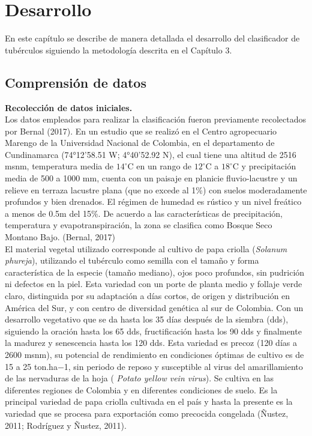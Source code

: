 \chapter{Desarrollo}

En este capítulo se describe de manera detallada el desarrollo del clasificador de tubérculos siguiendo la metodología descrita en el Capítulo 3.
\noindent
\section{Comprensión de datos}

\noindent
\textbf{Recolección de datos iniciales.}\\

Los datos empleados para realizar la clasificación fueron previamente recolectados por Bernal (2017). En un estudio que se realizó en el Centro agropecuario Marengo de la Universidad Nacional de Colombia, en el departamento de Cundinamarca (74°12'58.51 W; 4°40'52.92 N), el cual tiene una altitud de 2516 msnm, temperatura media de $14^\circ$C  en un rango de $12^\circ$C  a $18^\circ$C  y precipitación media de 500 a 1000 mm, cuenta con un paisaje en planicie fluvio-lacustre y un relieve en terraza lacustre plana (que no excede al 1\%) con suelos moderadamente profundos y bien drenados. El régimen de humedad es rústico y un nivel freático a menos de 0.5m del 15\%. De acuerdo a las características de precipitación, temperatura y evapotranspiración, la zona se clasifica como Bosque Seco Montano Bajo. (Bernal, 2017)\\

El material vegetal utilizado corresponde al cultivo de papa criolla (\textit{Solanum phureja}), utilizando el tubérculo como semilla con el tamaño y forma característica de la especie (tamaño mediano), ojos poco profundos, sin pudrición ni defectos en la piel. Esta variedad con un porte de planta medio y follaje verde claro, distinguida por su adaptación a días cortos, de origen y distribución en América del Sur, y con centro de diversidad genética al sur de Colombia. Con un desarrollo vegetativo que se da hasta los 35 días después de la siembra (dds), siguiendo la oración hasta los 65 dds, fructificación hasta los 90 dds y finalmente la madurez y senescencia hasta los 120 dds. Esta variedad es precoz (120 días a 2600 msnm), su potencial de rendimiento en condiciones óptimas de cultivo es de 15 a 25 ton.ha−1, sin periodo de reposo y susceptible al virus del amarillamiento de las nervaduras de la hoja ( \textit{Potato yellow vein virus}). Se cultiva en las diferentes regiones de Colombia y en diferentes condiciones de suelo. Es la principal variedad de papa criolla cultivada en el país y hasta la presente es la variedad que se procesa para exportación como precocida congelada (Ñustez, 2011; Rodríguez y Ñustez, 2011).\\

